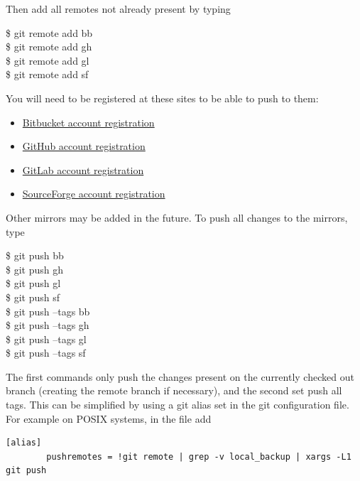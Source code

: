 Then add all remotes not already present by typing

\begin{exampleenv}
\$ git remote add bb \relaxMirrorBBCodeURLDeveloper \\
\$ git remote add gh \relaxMirrorGHCodeURLDeveloper \\
\$ git remote add gl \relaxMirrorGLCodeURLDeveloper \\
\$ git remote add sf \relaxMirrorSFCodeURLDeveloper
\end{exampleenv}

You will need to be registered at these sites to be able to push to them:
\begin{itemize}
    \item \href{\relaxMirrorBBRegisterURL}{Bitbucket account registration}
    \item \href{\relaxMirrorGHRegisterURL}{GitHub account registration}
    \item \href{\relaxMirrorGLRegisterURL}{GitLab account registration}
    \item \href{\relaxMirrorSFRegisterURL}{SourceForge account registration}
\end{itemize}

Other mirrors may be added in the future.
To push all changes to the mirrors, type

\begin{exampleenv}
\$ git push bb \\
\$ git push gh \\
\$ git push gl \\
\$ git push sf \\
\$ git push --tags bb \\
\$ git push --tags gh \\
\$ git push --tags gl \\
\$ git push --tags sf
\end{exampleenv}

The first commands only push the changes present on the currently checked out branch (creating the remote branch if necessary), and the second set push all tags.
This can be simplified by using a git alias set in the git configuration file.
For example on POSIX systems, in the file  add

\begin{footnotesize}
\begin{verbatim}
[alias]
        pushremotes = !git remote | grep -v local_backup | xargs -L1 git push
\end{verbatim}
\end{footnotesize}

